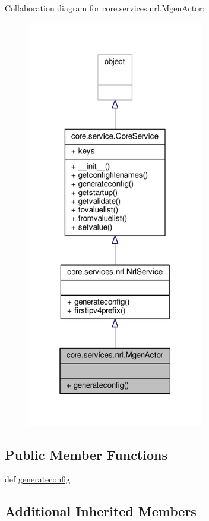 Collaboration diagram for core.\+services.\+nrl.\+Mgen\+Actor\+:
\nopagebreak
\begin{figure}[H]
\begin{center}
\leavevmode
\includegraphics[width=219pt]{classcore_1_1services_1_1nrl_1_1_mgen_actor__coll__graph}
\end{center}
\end{figure}
\subsection*{Public Member Functions}
\begin{DoxyCompactItemize}
\item 
def \hyperlink{classcore_1_1services_1_1nrl_1_1_mgen_actor_a703223d12b01f6dd733575d1d9ff6ca4}{generateconfig}
\end{DoxyCompactItemize}
\subsection*{Additional Inherited Members}


